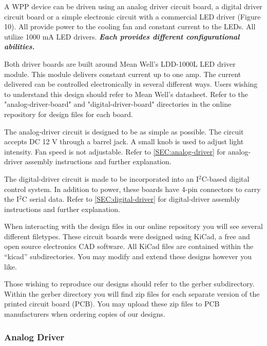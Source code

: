 \documentclass[11pt]{article}
\begin{document}
A WPP device can be driven using an analog driver circuit board, a digital driver circuit board or a simple electronic circuit with a commercial LED driver (Figure 10).
All provide power to the cooling fan and constant current to the LEDs.
All utilize 1000 mA LED drivers. \textbf{\textit{Each provides different configurational abilities.}}

Both driver boards are built around Mean Well's LDD-1000L LED driver module.
This module delivers constant current up to one amp.
The current delivered can be controlled electronically in several different ways.
Users wishing to understand this design should refer to Mean Well's datasheet.
Refer to the "analog-driver-board" and "digital-driver-board" directories in the online repository for design files for each board.

The analog-driver circuit is designed to be as simple as possible.
The circuit accepts DC 12 V through a barrel jack.
A small knob is used to adjust light intensity.
Fan speed is not adjustable.
Refer to \autoref{SEC:analog-driver} for analog-driver assembly instructions and further explanation.

The digital-driver circuit is made to be incorporated into an I$^2$C-based digital control system.
In addition to power, these boards have 4-pin connectors to carry the I$^2$C serial data.
Refer to \autoref{SEC:digital-driver} for digital-driver assembly instructions and further explanation.

When interacting with the design files in our online repository you will see several different filetypes.
These circuit boards were designed using KiCad, a free and open source electronics CAD software.
All KiCad files are contained within the ``kicad'' subdirectories.
You may modify and extend these designs however you like.

Those wishing to reproduce our designs should refer to the gerber subdirectory.
Within the gerber directory you will find zip files for each separate version of the printed circuit board (PCB).
You may upload these zip files to PCB manufacturers when ordering copies of our designs.

\clearpage
\subsubsection{Analog Driver} \label{SEC:analog-driver}
\end{document}
